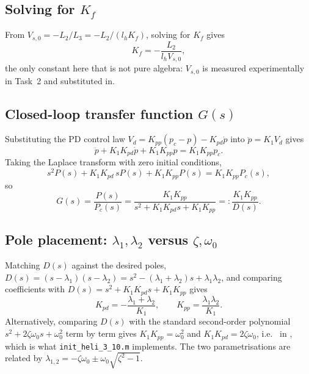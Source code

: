 \subsection{Solving for $K_f$}\label{app:Kf_derivation}
From $V_{s,0}=-L_2/L_3=-L_2/(l_hK_f)$, solving for $K_f$ gives
\begin{equation}
	K_f = -\frac{L_2}{l_hV_{s,0}},
\end{equation}
the only constant here that is not pure algebra: $V_{s,0}$ is measured experimentally in Task~2 and substituted in.

\subsection{Closed-loop transfer function $G(s)$}\label{app:G_derivation}
Substituting the PD control law $V_d=K_{pp}(p_c-p)-K_{pd}\dot p$ into $\ddot p=K_1V_d$ gives
\begin{equation}
	\ddot p + K_1K_{pd}\dot p + K_1K_{pp}p = K_1K_{pp}p_c.
\end{equation}
Taking the Laplace transform with zero initial conditions,
\begin{equation}
	s^2P(s) + K_1K_{pd}\,sP(s) + K_1K_{pp}P(s) = K_1K_{pp}P_c(s),
\end{equation}
so
\begin{equation}
	G(s) = \frac{P(s)}{P_c(s)} = \frac{K_1K_{pp}}{s^2+K_1K_{pd}s+K_1K_{pp}} =: \frac{K_1K_{pp}}{D(s)}.
\end{equation}

\subsection{Pole placement: $\lambda_1,\lambda_2$ versus $\zeta,\omega_0$}\label{app:pole_derivation}
Matching $D(s)$ against the desired poles, $D(s)=(s-\lambda_1)(s-\lambda_2)=s^2-(\lambda_1+\lambda_2)s+\lambda_1\lambda_2$, and comparing coefficients with $D(s)=s^2+K_1K_{pd}s+K_1K_{pp}$ gives
\begin{equation}\label{eq:kpp_kpd_lambda}
	K_{pd} = -\frac{\lambda_1+\lambda_2}{K_1}, \qquad K_{pp} = \frac{\lambda_1\lambda_2}{K_1}.
\end{equation}
Alternatively, comparing $D(s)$ with the standard second-order polynomial $s^2+2\zeta\omega_0s+\omega_0^2$ term by term gives $K_1K_{pp}=\omega_0^2$ and $K_1K_{pd}=2\zeta\omega_0$, i.e.\  in , which is what \texttt{init\_heli\_3\_10.m} implements. The two parametrisations are related by $\lambda_{1,2}=-\zeta\omega_0\pm\omega_0\sqrt{\zeta^2-1}$.

